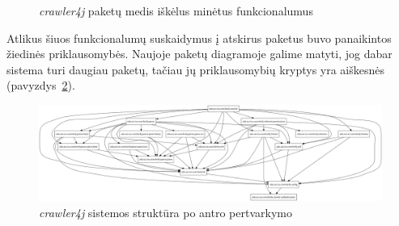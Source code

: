 \begin{figure}[H]
    \snugshade
    \endsnugshade
    \caption{\textit{crawler4j} paketų medis iškėlus minėtus funkcionalumus}
    \label{fig:crawlerjs}
\end{figure}

Atlikus šiuos funkcionalumų suskaidymus į atskirus paketus buvo panaikintos žiedinės priklausomybės.
Naujoje paketų diagramoje galime matyti, jog dabar sistema turi daugiau paketų, tačiau jų priklausomybių kryptys yra aiškesnės (pavyzdys~\ref{img:crawler_packages_v2}).
\begin{figure}[H]
    \centering
    \includegraphics[scale=0.2]{img/crawler_packages_v2}
    \caption{\textit{crawler4j} sistemos struktūra po antro pertvarkymo}
    \label{img:crawler_packages_v2}
\end{figure}

